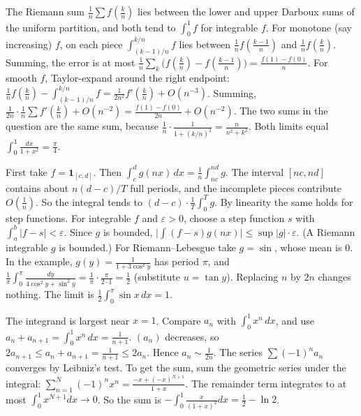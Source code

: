 \documentclass[11pt,a4paper]{article}
\begin{document}

 The Riemann sum $\frac1n\sum f(\frac kn)$ lies between the lower and upper Darboux sums of the uniform partition, and both tend to $\int_0^1f$ for integrable $f$. For monotone (say increasing) $f$, on each piece $\int_{(k-1)/n}^{k/n}f$ lies between $\frac1nf(\frac{k-1}n)$ and $\frac1nf(\frac kn)$. Summing, the error is at most $\frac1n\sum_k\bigl(f(\frac kn)-f(\frac{k-1}n)\bigr)=\frac{f(1)-f(0)}n$.
 For smooth $f$, Taylor-expand around the right endpoint: $\frac1nf(\frac kn)-\int_{(k-1)/n}^{k/n}f=\frac1{2n^2}f'(\frac kn)+O(n^{-3})$. Summing, $\frac1{2n}\cdot\frac1n\sum f'(\frac kn)+O(n^{-2})=\frac{f(1)-f(0)}{2n}+O(n^{-2})$.
 The two sums in the question are the same sum, because $\frac1n\cdot\frac1{1+(k/n)^2}=\frac n{n^2+k^2}$. Both limits equal $\int_0^1\frac{dx}{1+x^2}=\frac\pi4$.

 First take $f=\mathbf 1_{[c,d]}$. Then $\int_c^dg(nx)\,dx=\frac1n\int_{nc}^{nd}g$. The interval $[nc,nd]$ contains about $n(d-c)/T$ full periods, and the incomplete pieces contribute $O(\frac1n)$. So the integral tends to $(d-c)\cdot\frac1T\int_0^Tg$. By linearity the same holds for step functions.
 For integrable $f$ and $\varepsilon>0$, choose a step function $s$ with $\int_a^b|f-s|<\varepsilon$. Since $g$ is bounded, $\bigl|\int(f-s)g(nx)\bigr|\le\sup|g|\cdot\varepsilon$. (A Riemann integrable $g$ is bounded.) For Riemann--Lebesgue take $g=\sin$, whose mean is $0$.
 In the example, $g(y)=\frac1{1+3\cos^2y}$ has period $\pi$, and $\frac1\pi\int_0^\pi\frac{dy}{4\cos^2y+\sin^2y}=\frac1\pi\cdot\frac{\pi}{2\cdot1}=\frac12$ (substitute $u=\tan y$). Replacing $n$ by $2n$ changes nothing. The limit is $\frac12\int_0^\pi\sin x\,dx=1$.

 The integrand is largest near $x=1$. Compare $a_n$ with $\int_0^1x^n\,dx$, and use $a_n+a_{n+1}=\int_0^1x^n\,dx=\frac1{n+1}$.
 $(a_n)$ decreases, so $2a_{n+1}\le a_n+a_{n+1}=\frac1{n+1}\le2a_n$. Hence $a_n\sim\frac1{2n}$. The series $\sum(-1)^na_n$ converges by Leibniz's test.
 To get the sum, sum the geometric series under the integral: $\sum_{n=1}^N(-1)^nx^n=\frac{-x+(-x)^{N+1}}{1+x}$. The remainder term integrates to at most $\int_0^1x^{N+1}dx\to0$. So the sum is $-\int_0^1\frac{x}{(1+x)^2}dx=\frac12-\ln2$.
\end{document}
